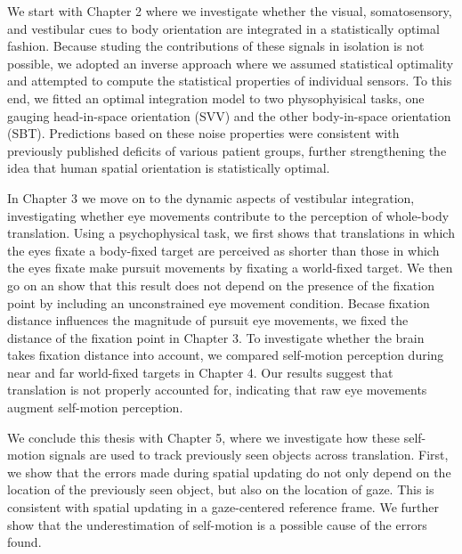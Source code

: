 We start with Chapter 2 where we investigate whether the visual, somatosensory, and vestibular cues to body orientation are integrated in a statistically optimal fashion. Because studing the contributions of these signals in isolation is not possible, we adopted an inverse approach where we assumed statistical optimality and attempted to compute the statistical properties of individual sensors. To this end, we fitted an optimal integration model to two physophyisical tasks, one gauging head-in-space orientation (SVV) and the other body-in-space orientation (SBT). Predictions based on these noise properties were consistent with previously published deficits of various patient groups, further strengthening the idea that human spatial orientation is statistically optimal.

In Chapter 3 we move on to the dynamic aspects of vestibular integration, investigating whether eye movements contribute to the perception of whole-body translation. Using a psychophysical task, we first shows that translations in which the eyes fixate a body-fixed target are perceived as shorter than those in which the eyes fixate make pursuit movements by fixating a world-fixed target. We then go on an show that this result does not depend on the presence of the fixation point by including an unconstrained eye movement condition. Becase fixation distance influences the magnitude of pursuit eye movements, we fixed the distance of the fixation point in Chapter 3. To investigate whether the brain takes fixation distance into account, we compared self-motion perception during near and far world-fixed targets in Chapter 4. Our results suggest that translation is not properly accounted for, indicating that raw eye movements augment self-motion perception.

We conclude this thesis with Chapter 5, where we investigate how these self-motion signals are used to track previously seen objects across translation. First, we show that the errors made during spatial updating do not only depend on the location of the previously seen object, but also on the location of gaze. This is consistent with spatial updating in a gaze-centered reference frame. We further show that the underestimation of self-motion is a possible cause of the errors found.
